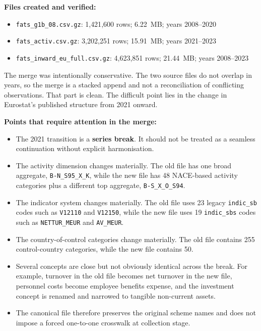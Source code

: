 \documentclass[11pt,a4paper]{article}
\begin{document}
\noindent\textbf{Files created and verified:}
\begin{itemize}[noitemsep]
    \item \texttt{fats\_g1b\_08.csv.gz}: 1{,}421{,}600 rows; 6.22~MB; years 2008--2020
    \item \texttt{fats\_activ.csv.gz}: 3{,}202{,}251 rows; 15.91~MB; years 2021--2023
    \item \texttt{fats\_inward\_eu\_full.csv.gz}: 4{,}623{,}851 rows; 21.44~MB; years 2008--2023
\end{itemize}

The merge was intentionally conservative.  The two source files do not overlap
in years, so the merge is a stacked append and not a reconciliation of
conflicting observations.  That part is clean.  The difficult point lies in the
change in Eurostat's published structure from 2021 onward.

\noindent\textbf{Points that require attention in the merge:}
\begin{itemize}[noitemsep]
    \item The 2021 transition is a \textbf{series break}.  It should not be
    treated as a seamless continuation without explicit harmonisation.
    \item The activity dimension changes materially.  The old file has one broad
    aggregate, \texttt{B-N\_S95\_X\_K}, while the new file has 48 NACE-based
    activity categories plus a different top aggregate,
    \texttt{B-S\_X\_O\_S94}.
    \item The indicator system changes materially.  The old file uses 23 legacy
    \texttt{indic\_sb} codes such as \texttt{V12110} and \texttt{V12150}, while
    the new file uses 19 \texttt{indic\_sbs} codes such as
    \texttt{NETTUR\_MEUR} and \texttt{AV\_MEUR}.
    \item The country-of-control categories change materially.  The old file
    contains 255 control-country categories, while the new file contains 50.
    \item Several concepts are close but not obviously identical across the
    break.  For example, turnover in the old file becomes net turnover in the
    new file, personnel costs become employee benefits expense, and the
    investment concept is renamed and narrowed to tangible non-current assets.
    \item The canonical file therefore preserves the original scheme names and
    does not impose a forced one-to-one crosswalk at collection stage.
\end{itemize}
\end{document}
